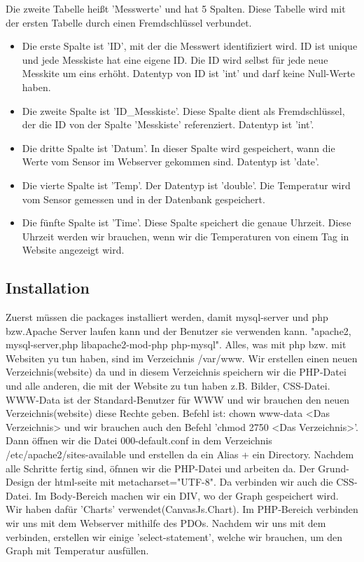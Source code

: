 	Die zweite Tabelle hei{\ss}t 'Messwerte' und hat 5 Spalten. Diese Tabelle wird mit der ersten Tabelle durch einen Fremdschl\"ussel verbundet.
	\begin{itemize}
		\item Die erste Spalte ist 'ID', mit der die Messwert identifiziert wird. ID ist unique und jede Messkiste hat eine eigene ID. Die ID wird selbst f\"ur jede neue Messkite um eins erh\"oht. Datentyp von ID ist 'int' und darf keine Null-Werte haben. 
		\item Die zweite Spalte ist 'ID\_Messkiste'. Diese Spalte dient als Fremdschl\"ussel, der die ID von der Spalte 'Messkiste' referenziert. Datentyp ist 'int'.
		\item Die dritte Spalte ist 'Datum'. In dieser Spalte wird gespeichert, wann die Werte vom Sensor im Webserver gekommen sind. Datentyp ist 'date'.
		\item Die vierte Spalte ist 'Temp'. Der Datentyp ist 'double'. Die Temperatur wird vom Sensor gemessen und in der Datenbank gespeichert.
		\item Die f\"unfte Spalte ist 'Time'. Diese Spalte speichert die genaue Uhrzeit. Diese Uhrzeit werden wir brauchen, wenn wir die Temperaturen von einem Tag in Website angezeigt wird.  
	\end{itemize}
	\subsection{Installation}
	Zuerst m\"ussen die packages installiert werden, damit mysql-server und php bzw.Apache Server laufen kann und der Benutzer sie verwenden kann. "apache2, mysql-server,php libapache2-mod-php php-mysql". Alles, was mit php bzw. mit Websiten yu tun haben, sind im Verzeichnis /var/www. Wir erstellen einen neuen Verzeichnis(website) da und in diesem Verzeichnis speichern wir die PHP-Datei und alle anderen, die mit der Website zu tun haben z.B. Bilder, CSS-Datei. WWW-Data ist der Standard-Benutzer f\"ur WWW und wir brauchen den neuen Verzeichnis(website) diese Rechte geben. Befehl ist: chown www-data <Das Verzeichnis> und wir brauchen auch den Befehl 'chmod 2750 <Das Verzeichnis>'. Dann \"offnen wir die Datei 000-default.conf in dem Verzeichnis /etc/apache2/sites-available und erstellen da ein Alias + ein Directory. Nachdem alle Schritte fertig sind, \"ofnnen wir die PHP-Datei und arbeiten da. 
	Der Grund-Design der html-seite mit metacharset="UTF-8". Da verbinden wir auch die CSS-Datei. Im Body-Bereich machen wir ein DIV, wo der Graph gespeichert wird. Wir haben daf\"ur 'Charts' verwendet(CanvasJs.Chart). Im PHP-Bereich verbinden wir uns mit dem Webserver mithilfe des PDOs. Nachdem wir uns mit dem verbinden, erstellen wir einige 'select-statement', welche wir brauchen, um den Graph mit Temperatur ausf\"ullen. 
